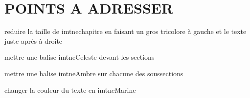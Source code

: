 \section{POINTS A ADRESSER}
reduire la taille de imtnechapitre en faisant un gros tricolore à gauche et le texte juste après à droite 

mettre une balise imtneCeleste devant les sections

mettre une balise imtneAmbre sur chacune des soussections 

changer la couleur du texte en imtneMarine



























\clearpage
